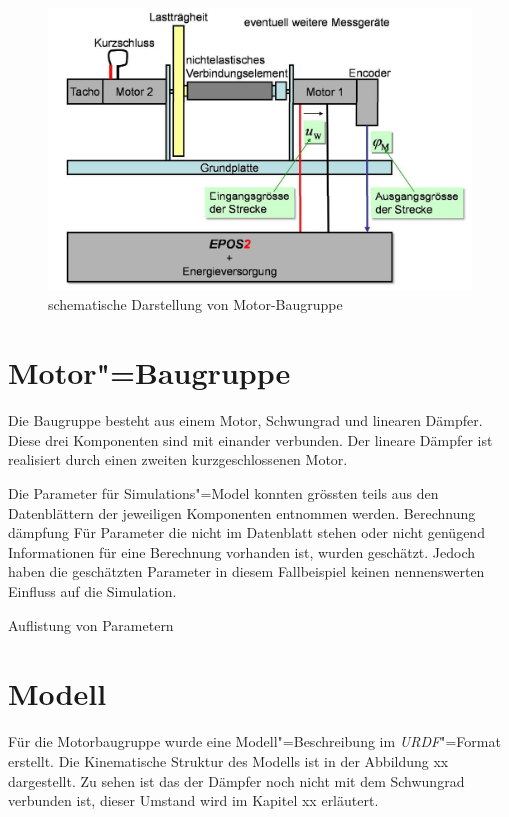\begin{figure}[ht!]
	\centering
	\includegraphics[width=14.5cm]{images/motor_baugruppe.png} %
	\caption{schematische Darstellung von Motor-Baugruppe}
	\label{Ab:motor-baugruppe}
\end{figure}

\section{Motor"=Baugruppe}
Die Baugruppe besteht aus einem Motor, Schwungrad und linearen Dämpfer.
Diese drei Komponenten sind mit einander verbunden.
Der lineare Dämpfer ist realisiert durch einen zweiten kurzgeschlossenen Motor.

Die Parameter für Simulations"=Model konnten grössten teils aus den Datenblättern der jeweiligen Komponenten entnommen werden. %
Berechnung dämpfung
Für Parameter die nicht im Datenblatt stehen oder nicht genügend Informationen für eine Berechnung vorhanden ist, wurden geschätzt.
Jedoch haben die geschätzten Parameter in diesem Fallbeispiel keinen nennenswerten Einfluss auf die Simulation.

Auflistung von Parametern





\section{Modell}
Für die Motorbaugruppe wurde eine Modell"=Beschreibung im \textit{URDF}"=Format erstellt.
Die Kinematische Struktur des Modells ist in der Abbildung xx dargestellt.
Zu sehen ist das der Dämpfer noch nicht mit dem Schwungrad verbunden ist, dieser Umstand wird im Kapitel xx erläutert. %



